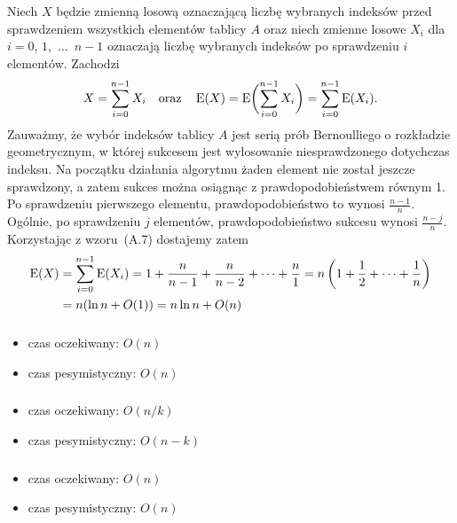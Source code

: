 \subsubsection{} %
Niech $X$ będzie zmienną losową oznaczającą liczbę wybranych indeksów przed sprawdzeniem wszystkich elementów tablicy $A$ oraz niech zmienne losowe $X_i$ dla $i=0$, $1$,~$\dots$~$n-1$ oznaczają liczbę wybranych indeksów po sprawdzeniu $i$ elementów. Zachodzi
\[
	X = \sum_{i=0}^{n-1}X_i \quad\text{oraz}\quad \operatorname{E}(X) = \operatorname{E}\biggl(\sum_{i=0}^{n-1}X_i\biggr) = \sum_{i=0}^{n-1}\operatorname{E}(X_i).
\]
Zauważmy, że wybór indeksów tablicy $A$ jest serią prób Bernoulliego o rozkładzie geometrycznym, w której sukcesem jest wylosowanie niesprawdzonego dotychczas indeksu. Na początku działania algorytmu żaden element nie został jeszcze sprawdzony, a zatem sukces można osiągnąc z prawdopodobieństwem równym 1. Po sprawdzeniu pierwszego elementu, prawdopodobieństwo to wynosi $\frac{n-1}{n}$. Ogólnie, po sprawdzeniu $j$ elementów, prawdopodobieństwo sukcesu wynosi $\frac{n-j}{n}$. Korzystając z wzoru~(A.7) dostajemy zatem
\begin{align*}
	\operatorname{E}(X) &= \sum_{i=0}^{n-1}\operatorname{E}(X_i) = 1+\frac{n}{n-1}+\frac{n}{n-2}+\dots+\frac{n}{1} = n\left(1+\frac{1}{2}+\dots+\frac{1}{n}\right) \\
	&= n(\ln n+O(1)) = n\ln n+O(n)
\end{align*}

\subsubsection{} %
\begin{itemize}
	\item czas oczekiwany: $O(n)$
	\item czas pesymistyczny: $O(n)$
\end{itemize}

\subsubsection{} %
\begin{itemize}
	\item czas oczekiwany: $O(n/k)$
	\item czas pesymistyczny: $O(n-k)$
\end{itemize}

\subsubsection{} %
\begin{itemize}
	\item czas oczekiwany: $O(n)$
	\item czas pesymistyczny: $O(n)$
\end{itemize}

